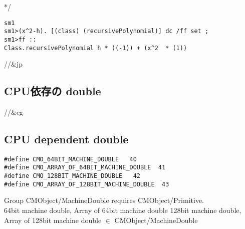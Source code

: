*/

\noindent
\begin{verbatim}
sm1
sm1>(x^2-h). [(class) (recursivePolynomial)] dc /ff set ;
sm1>ff ::
Class.recursivePolynomial h * ((-1)) + (x^2  * (1))
\end{verbatim}

//&jp \subsection{CPU依存の double } 
//&eg \subsection{CPU dependent double} 

\begin{verbatim}
#define CMO_64BIT_MACHINE_DOUBLE   40
#define CMO_ARRAY_OF_64BIT_MACHINE_DOUBLE  41
#define CMO_128BIT_MACHINE_DOUBLE   42
#define CMO_ARRAY_OF_128BIT_MACHINE_DOUBLE  43
\end{verbatim}

\noindent
Group CMObject/MachineDouble requires CMObject/Primitive.\\
64bit machine double, Array of 64bit machine double
128bit machine double, Array of 128bit machine double
$\in$ CMObject/MachineDouble \\

